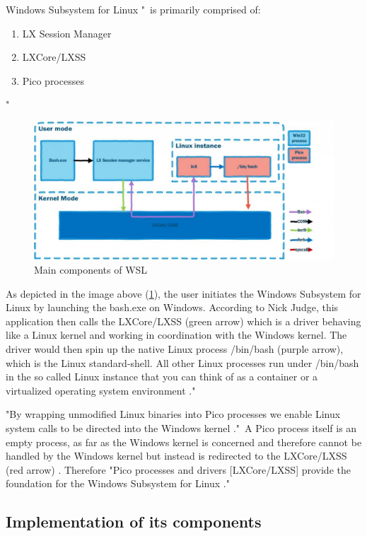 \documentclass[utf8,biblatex, ngerman, english]{lni}
\begin{document}
Windows Subsystem for Linux "\ is primarily comprised of: 
\begin{enumerate}
    \item LX Session Manager
    \item LXCore/LXSS
    \item Pico processes
\end{enumerate} \cite{Ha16b}"

\begin{figure}
  \centering
  \includegraphics[width=1\textwidth]{WSL Architecture.pdf}
  \caption{Main components of WSL \cite{Ha16b}}
  \label{img:architecture}
\end{figure}

As depicted in the image above (\ref{img:architecture}), the user initiates the Windows Subsystem for Linux by launching the bash.exe on Windows. According to Nick Judge, this application then calls the LXCore/LXSS (green arrow) which is a driver behaving like a Linux kernel and working in coordination with the Windows kernel. The driver would then spin up the native Linux process /bin/bash (purple arrow), which is the Linux standard-shell. All other Linux processes run under /bin/bash in the so called Linux instance that you can think of as a container or a virtualized operating system environment \cite{Ha16a}."

"By wrapping unmodified Linux binaries into Pico processes we enable Linux system calls to be directed into the Windows kernel \cite{Ha16b}."\ A Pico process itself is an empty process, as far as the Windows kernel is concerned and therefore cannot be handled by the Windows kernel but instead is redirected to the LXCore/LXSS (red arrow) \cite{Ha16a}.
Therefore "Pico processes and drivers [LXCore/LXSS] provide the foundation for the Windows Subsystem for Linux \cite{Ha16b}."

\subsection{Implementation of its components}
\end{document}
